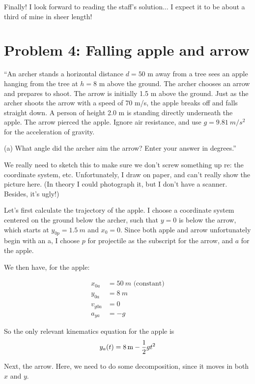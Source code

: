 \documentclass[12pt,a4paper]{report}
\begin{document}
Finally! I look forward to reading the staff's solution... I expect it to be about a third of mine in sheer length!

\section{Problem 4: Falling apple and arrow}

``An archer stands a horizontal distance $d = 50$ m away from a tree sees an apple hanging from the tree at $h = 8$ m above the ground. The archer chooses an arrow and prepares to shoot. The arrow is initially 1.5 m above the ground. Just as the archer shoots the arrow with a speed of 70 m/s, the apple breaks off and falls straight down. A person of height 2.0 m is standing directly underneath the apple. The arrow pierced the apple. Ignore air resistance, and use $g = \SI{9.81}{m/s^2}$ for the acceleration of gravity.

(a) What angle did the archer aim the arrow? Enter your answer in degrees.''

We really need to sketch this to make sure we don't screw something up re: the coordinate system, etc. Unfortunately, I draw on paper, and can't really show the picture here. (In theory I could photograph it, but I don't have a scanner. Besides, it's ugly!)

Let's first calculate the trajectory of the apple. I choose a coordinate system centered on the ground below the archer, such that $y = 0$ is below the arrow, which starts at $y_{0p} = \SI{1.5}{m}$ and $x_0 = 0$. Since both apple and arrow unfortunately begin with an a, I choose $p$ for projectile as the subscript for the arrow, and $a$ for the apple.

We then have, for the apple:

\begin{align}
x_{0a} &= \SI{50}{m} \text{ (constant)}\\
y_{0a} &= \SI{8}{m}\\
v_{y0a} &= 0\\
a_{ya} &= -g
\end{align}

So the only relevant kinematics equation for the apple is
\begin{equation}
y_{a}(t) = \SI{8}{m} - \frac{1}{2} g t^2\\
\end{equation}

Next, the arrow. Here, we need to do some decomposition, since it moves in both $x$ and $y$.
\end{document}
